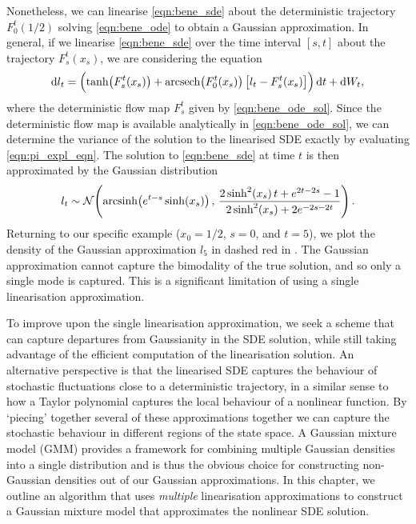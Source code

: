 Nonetheless, we can linearise \cref{eqn:bene_sde} about the deterministic trajectory \(F_0^t\!\left(1/2\right)\) solving \cref{eqn:bene_ode} to obtain a Gaussian approximation.
In general, if we linearise \cref{eqn:bene_sde} over the time interval \([s,t]\) about the trajectory \(F_s^t\!\left(x_s\right)\), we are considering the equation
\[
	\dif l_t = \left(\tanh\!\left(F_s^t\!\left(x_s\right)\right) + \arcsech\!\left(F_0^t\!\left(x_s\right)\right)\left[l_t - F_s^t\!\left(x_s\right)\right]\right)\dif t + \dif W_t,
\]
where the deterministic flow map \(F_s^t\) given by \cref{eqn:bene_ode_sol}.
Since the deterministic flow map is available analytically in \cref{eqn:bene_ode_sol}, we can determine the variance of the solution to the linearised SDE exactly by evaluating \cref{eqn:pi_expl_eqn}.
The solution to \cref{eqn:bene_sde} at time \(t\) is then approximated by the Gaussian distribution
\[
	l_t \sim \mathcal{N}\!\left(\operatorname{arcsinh}\!\left(e^{t - s} \sinh\!\left(x_s\right)\right),\, \frac{2\sinh^2\!\left(x_s\right)t + e^{2t - 2s} - 1}{2\sinh^2\!\left(x_s\right) + 2e^{-2s-2t}}\right).
\]
Returning to our specific example (\(x_0 = 1/2\), \(s = 0\), and \(t = 5\)), we plot the density of the Gaussian approximation \(l_5\) in dashed red in .
The Gaussian approximation cannot capture the bimodality of the true solution, and so only a single mode is captured.
This is a significant limitation of using a single linearisation approximation.


To improve upon the single linearisation approximation, we  seek a scheme that can capture departures from Gaussianity in the SDE solution, while still taking advantage of the efficient computation of the linearisation solution.
An alternative perspective is that the linearised SDE captures the behaviour of stochastic fluctuations close to a deterministic trajectory, in a similar sense to how a Taylor polynomial captures the local behaviour of a nonlinear function.
By `piecing' together several of these approximations together we can capture the stochastic behaviour in different regions of the state space.
A Gaussian mixture model (GMM) provides a framework for combining multiple Gaussian densities into a single distribution and is thus the obvious choice for constructing non-Gaussian densities out of our Gaussian approximations.
In this chapter, we outline an algorithm that uses \emph{multiple} linearisation approximations to construct a Gaussian mixture model that approximates the nonlinear SDE solution.

